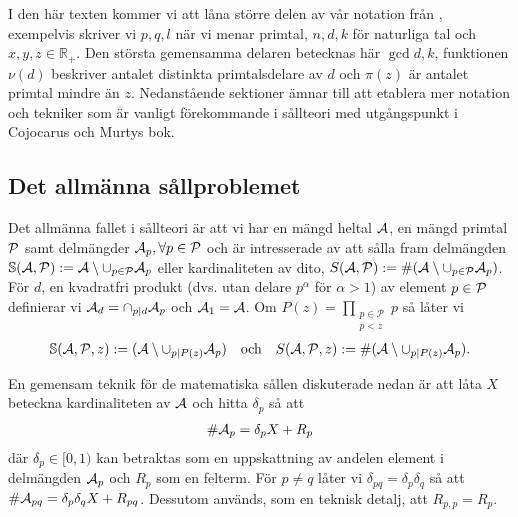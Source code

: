 
I den här texten kommer vi att låna större delen av vår notation från \cite{cojocarumurty}, exempelvis skriver vi \(p, q, l\) när vi menar primtal, \(n, d, k\) för naturliga tal och \(x, y, z \in \mathbb{R}_+\). Den största gemensamma delaren betecknas här \(\gcd{d, k}\), funktionen \(\nu(d)\) beskriver antalet distinkta primtalsdelare av \(d\) och \(\pi(z)\) är antalet primtal mindre än \(z\). Nedanstående sektioner ämnar till att etablera mer notation och tekniker som är vanligt förekommande i sållteori med utgångspunkt i Cojocarus och Murtys bok.


\subsection{Det allmänna sållproblemet}
Det allmänna fallet i sållteori är att vi har en mängd heltal \(\A\), en mängd primtal \(\P\) samt delmängder \(\A_p, \forall p \in \P\) och är intresserade av att sålla fram delmängden \(\mathbb{S}(\A, \P) := \A \setminus \cup_{p \in \P} \A_p\) eller kardinaliteten av dito, \(S(\A, \P) :=\card{(\A \setminus \cup_{p \in \P} \A_p)}\). För \(d\), en kvadratfri produkt (dvs. utan delare \(p^\alpha\) för \(\alpha > 1\)) av element \(p \in \P\) definierar vi \(\A_d = \cap_{p \divides d} \A_p\) och \(\A_1 = \A\). Om \(P(z) = \prod_{\substack{p\in \mathcal{P} \\ p < z}} p\) så låter vi
\begin{align*}
    \mathbb{S}(\A, \P, z) := (\A \setminus \cup_{p \divides P(z)} \A_p)
    \quad \text{och} \quad
    \S{A}{P}{z} := \card{(\A \setminus \cup_{p \divides P(z)} \A_p)} .
\end{align*}

En gemensam teknik för de matematiska sållen diskuterade nedan är att låta \(X\) beteckna kardinaliteten av \(\A\) och hitta \(\delta_p\) så att
\begin{align*}
    \card{\A_p} = \delta_p X + R_p
\end{align*}
där \(\delta_p \in [0, 1)\) kan betraktas som en uppskattning av andelen element i delmängden \(\A_p\) och \(R_p\) som en felterm. För \(p \neq q\) låter vi \(\delta_{pq} = \delta_p \delta_q\) så att \(\card{\A_{pq}} = \delta_p \delta_q X + R_{pq}\). Dessutom används, som en teknisk detalj, att \(R_{p,p} = R_p\).


